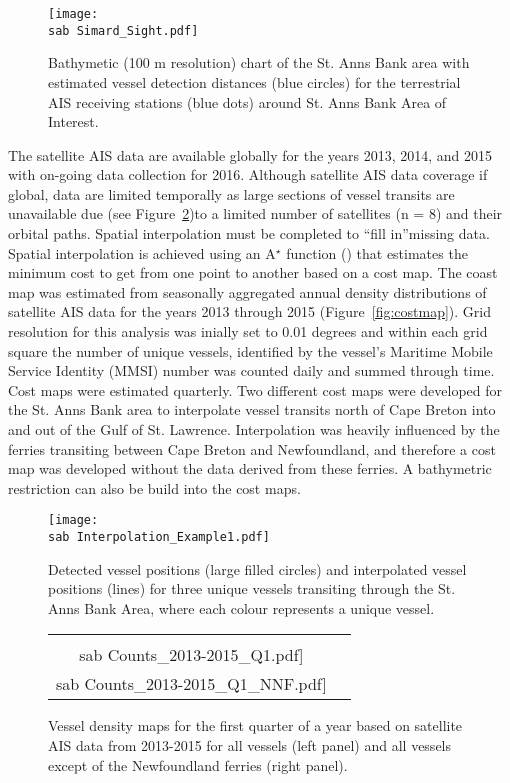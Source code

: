 \documentclass[letterpaper,portrait,11pt]{scrartcl}
\numberwithin{equation}{section}		%
\numberwithin{figure}{section}		%
\numberwithin{table}{section}				%
\newcommand{\ecomod}{\string~/ecomod_data/}   %
\newcommand{\sab}{\ecomod/mpa/sab/}   %
\begin{document}
\begin{figure}[h]
	\centering
	\texttt{[image: \\sab Simard\_Sight.pdf]}
	\caption{Bathymetic (100 m resolution) chart of the  St. Anns Bank area with  \cite{Simard2014shipping} estimated vessel detection distances (blue circles) for the terrestrial AIS receiving stations (blue dots) around St. Anns Bank Area of Interest.}
  \label{fig:DetAIS}
\end{figure}


The satellite AIS data are available globally for the years 2013, 2014, and 2015 with on-going data collection for 2016. Although satellite AIS data coverage if global, data are limited temporally as large sections of vessel transits are unavailable due (see Figure~\ref{fig:astar})to a limited number of satellites (n = 8) and their orbital paths.  Spatial interpolation must be completed to \textquotedblleft fill in\textquotedblright  missing data.  Spatial interpolation is achieved using an A$^{\star}$ function  (\cite{hart1968formal})  that estimates the minimum cost to get from one point to another based on a cost map.  The coast map was estimated from seasonally aggregated annual density distributions of satellite AIS data for the years 2013 through 2015 (Figure~\ref{fig:costmap}).  Grid resolution for this analysis was inially set to 0.01 degrees and within each grid square the number of unique vessels, identified by the vessel's Maritime Mobile Service Identity (MMSI) number was counted daily and summed through time.  Cost maps were estimated quarterly.  Two different cost maps were developed for the St. Anns Bank area to interpolate vessel transits north of Cape Breton into and out of the Gulf of St. Lawrence.  Interpolation was heavily influenced by the ferries transiting between Cape Breton and Newfoundland, and therefore a cost map was developed without the data derived from these ferries.  A bathymetric restriction can also be build into the cost maps.

\begin{figure}[h]
	\centering
	\texttt{[image: \\sab Interpolation\_Example1.pdf]}
	\caption{Detected vessel positions (large filled circles) and interpolated vessel positions (lines) for three unique vessels transiting through the St. Anns Bank Area, where each colour represents a unique vessel.}
	\label{fig:astar}
\end{figure}


\begin{figure}[h]

	\centering
	\begin{tabular}{cc}
		\texttt{[image: \\sab Counts\_2013-2015\_Q1.pdf]} &
		\texttt{[image: \\sab Counts\_2013-2015\_Q1\_NNF.pdf]}
	\end{tabular}
	\caption{Vessel density maps for the first quarter of a year based on satellite AIS data from 2013-2015 for all vessels (left panel) and all vessels except of the Newfoundland ferries (right panel).}
	\label{fig:countmaps}
\end{figure}
\end{document}
